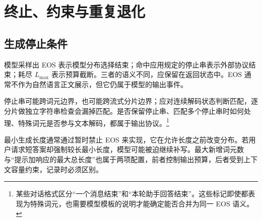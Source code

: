 \documentclass[../textbook.tex]{subfiles}
\begin{document}
\section{终止、约束与重复退化}

\subsection{生成停止条件}
模型采样出 EOS 表示模型分布选择结束；命中应用规定的停止串表示外部协议结束；耗尽 $L_{\max}$ 表示预算截断。三者的语义不同，应保留在返回状态中。EOS 通常不作为自然语言正文展示，但它仍属于模型的输出事件。

停止串可能跨词元边界，也可能跨流式分片边界；应对连续解码状态判断匹配，逐分片做独立字符串检查会漏掉匹配。是否保留停止串、匹配多个停止串时如何处理、特殊词元是否参与文本解码，都属于输出协议。\footnote{某些对话格式区分“一个消息结束”和“本轮助手回答结束”。这些标记即使都表现为特殊词元，也需要模型模板的说明才能确定能否合并为同一 EOS 语义。}

最小生成长度通常通过暂时禁止 EOS 来实现，它在允许长度之前改变分布。若用户请求短答案却强制较长最小长度，模型可能被迫继续补写。最大新增词元数与“提示加响应的最大总长度”也属于两项配置，前者控制输出预算，后者受到上下文容量约束，记录时必须区别。
\end{document}
